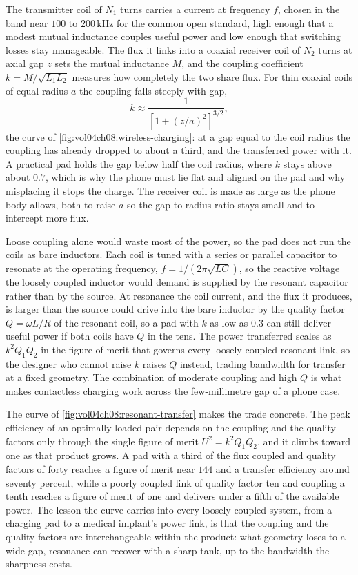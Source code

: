 The transmitter coil of $N_1$ turns carries a current at frequency $f$,
chosen in the band near $100$ to $200\,\si{\kilo\hertz}$ for the common
open standard, high enough that a modest mutual inductance couples useful
power and low enough that switching losses stay manageable. The flux it
links into a coaxial receiver coil of $N_2$ turns at axial gap $z$ sets
the mutual inductance $M$, and the coupling coefficient $k = M/\sqrt{L_1
L_2}$ measures how completely the two share flux. For thin coaxial coils
of equal radius $a$ the coupling falls steeply with gap,
\[
k \approx \frac{1}{\left[1 + (z/a)^{2}\right]^{3/2}},
\]
the curve of \cref{fig:vol04ch08:wireless-charging}: at a gap equal to the
coil radius the coupling has already dropped to about a third, and the
transferred power with it. A practical pad holds the gap below half the
coil radius, where $k$ stays above about $0.7$, which is why the phone
must lie flat and aligned on the pad and why misplacing it stops the
charge. The receiver coil is made as large as the phone body allows, both
to raise $a$ so the gap-to-radius ratio stays small and to intercept more
flux.



Loose coupling alone would waste most of the power, so the pad does not
run the coils as bare inductors. Each coil is tuned with a series or
parallel capacitor to resonate at the operating frequency, $f = 1/(2\pi
\sqrt{LC})$, so the reactive voltage the loosely coupled inductor would
demand is supplied by the resonant capacitor rather than by the source.
At resonance the coil current, and the flux it produces, is larger than
the source could drive into the bare inductor by the quality factor $Q =
\omega L/R$ of the resonant coil, so a pad with $k$ as low as $0.3$ can
still deliver useful power if both coils have $Q$ in the tens. The
power transferred scales as $k^{2}Q_1 Q_2$ in the figure of merit that
governs every loosely coupled resonant link, so the designer who cannot
raise $k$ raises $Q$ instead, trading bandwidth for transfer at a fixed
geometry. The combination of moderate coupling and high $Q$ is what makes
contactless charging work across the few-millimetre gap of a phone case.

The curve of \cref{fig:vol04ch08:resonant-transfer} makes the trade
concrete. The peak efficiency of an optimally loaded pair depends on the
coupling and the quality factors only through the single figure of merit
$U^{2} = k^{2}Q_1 Q_2$, and it climbs toward one as that product grows. A
pad with a third of the flux coupled and quality factors of forty reaches a
figure of merit near $144$ and a transfer efficiency around seventy
percent, while a poorly coupled link of quality factor ten and coupling a
tenth reaches a figure of merit of one and delivers under a fifth of the
available power. The lesson the curve carries into every loosely coupled
system, from a charging pad to a medical implant's power link, is that the
coupling and the quality factors are interchangeable within the product:
what geometry loses to a wide gap, resonance can recover with a sharp tank,
up to the bandwidth the sharpness costs.

